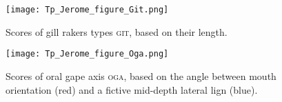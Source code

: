 \begin{figure} [!htbp]
	\begin{center}
	\begin{minipage}{0.45\textwidth}
		\centering
		\texttt{[image: Tp\_Jerome\_figure\_Git.png]}
		\caption[Petite légende]{Scores of gill rakers types \textsc{git}, based on their length.}
		\label{fig:app4}
	\end{minipage}\hfill
	\begin{minipage}{0.45\textwidth}
		\centering
		\texttt{[image: Tp\_Jerome\_figure\_Oga.png]}
		\caption[Petite légende]{Scores of oral gape axis \textsc{oga}, based on the angle between mouth orientation (red) and a fictive mid-depth lateral lign (blue).}
		\label{fig:app5}
	\end{minipage}
	\end{center}
	
\end{figure}
